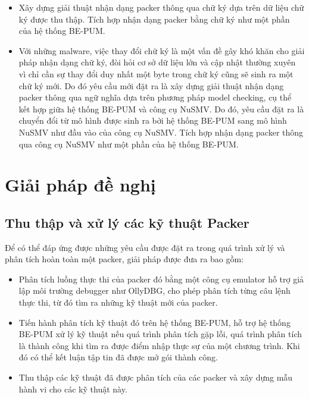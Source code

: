 \begin{itemize}
\item{Xây dựng giải thuật nhận dạng packer thông qua chữ ký dựa trên dữ liệu chữ ký được thu thập. Tích hợp nhận dạng packer bằng chữ ký như một phần của hệ thống BE-PUM.\\}
\item{Với những malware, việc thay đổi chữ ký là một vấn đề gây khó khăn cho giải pháp nhận dạng chữ ký, đòi hỏi cơ sở dữ liệu lớn và cập nhật thường xuyên vì chỉ cần sự thay đổi duy nhất một byte trong chữ ký cũng sẽ sinh ra một chữ ký mới. Do đó yêu cầu mới đặt ra là xây dựng giải thuật nhận dạng packer thông qua ngữ nghĩa dựa trên phương pháp model checking, cụ thể kết hợp giữa hệ thống BE-PUM và công cụ NuSMV. Do đó, yêu cầu đặt ra là chuyển đổi từ mô hình được sinh ra bởi hệ thống BE-PUM sang mô hình NuSMV như đầu vào của công cụ NuSMV. Tích hợp nhận dạng packer thông qua công cụ NuSMV như một phần của hệ thống BE-PUM.}
\end{itemize}

\section{Giải pháp đề nghị}

\subsection {Thu thập và xử lý các kỹ thuật Packer}

\hspace{0.5cm}Để có thể đáp ứng được những yêu cầu được đặt ra trong quá trình xử lý và phân tích hoàn toàn một packer, giải pháp được đưa ra bao gồm:

\begin{itemize}
\item{Phân tích luồng thực thi của packer đó bằng một công cụ emulator hỗ trợ giả lập môi trường debugger như OllyDBG, cho phép phân tích từng câu lệnh thực thi, từ đó tìm ra những kỹ thuật mới của packer.\\}
\item{Tiến hành phân tích kỹ thuật đó trên hệ thống BE-PUM, hỗ trợ hệ thống BE-PUM xử lý kỹ thuật nếu quá trình phân tích gặp lỗi, quá trình phân tích là thành công khi tìm ra được điểm nhập thực sự của một chương trình. Khi đó có thể kết luận tập tin đã được mở gói thành công.\\}
\item{Thu thập các kỹ thuật đã được phân tích của các packer và xây dựng mẫu hành vi cho các kỹ thuật này.}
\end{itemize} 


